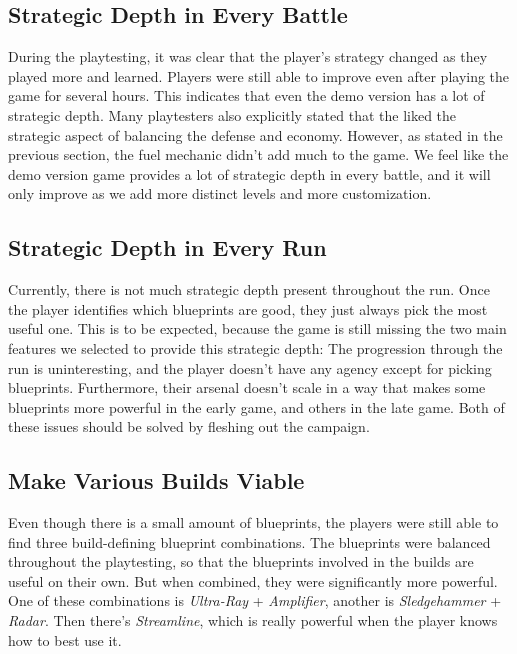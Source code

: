 \subsection{Strategic Depth in Every Battle}

During the playtesting, it was clear that the player's strategy changed as they played more and learned.
Players were still able to improve even after playing the game for several hours.
This indicates that even the demo version has a lot of strategic depth.
Many playtesters also explicitly stated that the liked the strategic aspect of balancing the defense and economy.
However, as stated in the previous section, the fuel mechanic didn't add much to the game.
We feel like the demo version game provides a lot of strategic depth in every battle, and it will only improve as we add more distinct levels and more customization.

\subsection{Strategic Depth in Every Run}

Currently, there is not much strategic depth present throughout the run.
Once the player identifies which blueprints are good, they just always pick the most useful one.
This is to be expected, because the game is still missing the two main features we selected to provide this strategic depth:
The progression through the run is uninteresting, and the player doesn't have any agency except for picking blueprints.
Furthermore, their arsenal doesn't scale in a way that makes some blueprints more powerful in the early game, and others in the late game.
Both of these issues should be solved by fleshing out the campaign.

\subsection{Make Various Builds Viable}

Even though there is a small amount of blueprints, the players were still able to find three build-defining blueprint combinations.
The blueprints were balanced throughout the playtesting, so that the blueprints involved in the builds are useful on their own.
But when combined, they were significantly more powerful.
One of these combinations is \emph{Ultra-Ray} + \emph{Amplifier}, another is \emph{Sledgehammer} + \emph{Radar}.
Then there's \emph{Streamline}, which is really powerful when the player knows how to best use it.

